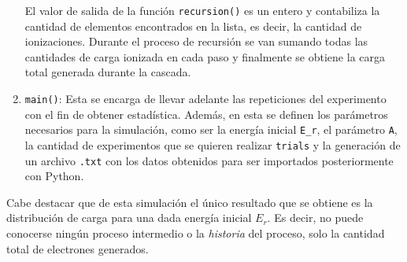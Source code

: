 \begin{enumerate}[label=\arabic*., listparindent=1.5em]
    \indent El valor de salida de la función \verb|recursion()| es un entero y contabiliza la cantidad de elementos encontrados en la lista, es decir, la cantidad de ionizaciones. Durante el proceso de recursión se van sumando todas las cantidades de carga ionizada en cada paso y finalmente se obtiene la carga total generada durante la cascada.
    \item \verb|main()|: Esta se encarga de llevar adelante las repeticiones del experimento con el fin de obtener estadística. Además, en esta se definen los parámetros necesarios para la simulación, como ser la energía inicial \verb|E_r|, el parámetro \verb|A|, la cantidad de experimentos que se quieren realizar \verb|trials| y la generación de un archivo \verb|.txt| con los datos obtenidos para ser importados posteriormente con Python.
\end{enumerate}
Cabe destacar que de esta simulación el único resultado que se obtiene es la distribución de carga para una dada energía inicial $E_{r}$. Es decir, no puede conocerse ningún proceso intermedio o la \textit{historia} del proceso, solo la cantidad total de electrones generados.